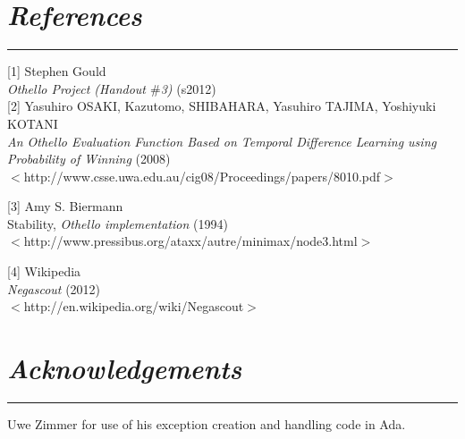 \documentclass[10pt]{report}
\begin{document}
\begin{multicols}{2}
\section*{\emph{References}}
\hrule

[1]
Stephen Gould\\
\emph{Othello Project (Handout $\#$3)} (s2012)\\
  
[2] Yasuhiro OSAKI, Kazutomo, SHIBAHARA, Yasuhiro TAJIMA, Yoshiyuki KOTANI\\
\emph{An Othello Evaluation Function Based on Temporal Difference Learning using Probability of Winning} (2008)\\
$<$http://www.csse.uwa.edu.au/cig08/Proceedings/papers/8010.pdf$>$

[3]
Amy S. Biermann\\
Stability, \emph{Othello implementation} (1994)\\
$<$http://www.pressibus.org/ataxx/autre/minimax/node3.html$>$

[4]
Wikipedia\\
\emph{Negascout} (2012)\\
$<$http://en.wikipedia.org/wiki/Negascout$>$

\section*{\emph{\textmd{Acknowledgements}}}
\hrule
\vspace{0.4cm}

Uwe Zimmer for use of his exception creation and handling code in Ada.
\end{multicols}
\end{document}
